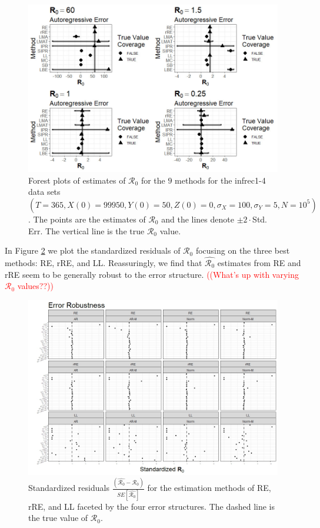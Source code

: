 \documentclass[12pt]{article}
\newcommand{\com}[1]{\textcolor{red}{ #1}}
\newcommand{\xxsir}{\ensuremath{9} } %
\newcommand{\rr}{\ensuremath{\mathcal{R}_0}}
\begin{document}
\begin{figure}[H]
	\centering
	\includegraphics[scale=0.5]{images/parchange_ar.jpg}
	\caption{Forest plots of estimates of $\rr$ for the \xxsir methods for the infrec1-4 data sets $(T=365, X(0)=99950, Y(0)=50, Z(0)=0, \sigma_X=100, \sigma_Y=5, N=10^5)$.  The points are the estimates of $\rr$ and the lines denote $\pm 2\cdot $Std. Err.  The vertical line is the true $\rr$ value.}\label{fig:ar-r0}
\end{figure}


 In Figure \ref{fig:err-rob} we plot the standardized residuals of $\rr$ focusing on the three best methods: RE, rRE, and LL.  Reassuringly, we find that $\hat{\rr}$ estimates from RE and rRE seem to be generally robust to the error structure.  \com{((What's up with varying $\rr$ values??))}

\begin{figure}[H]
	\centering
	\includegraphics[scale=0.5]{images/err_robust.jpeg}
	\caption{Standardized residuals $\frac{\left ( \hat{\rr} - \rr\right ) }{SE \left [\hat{\rr}\right ]}$ for the estimation methods of RE, rRE, and LL faceted by the four error structures.  The dashed line is the true value of $\rr$.}\label{fig:err-rob}
\end{figure}
\end{document}
